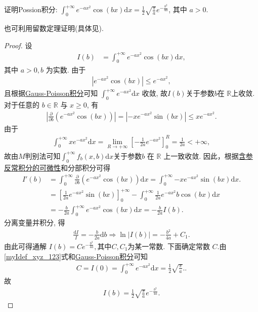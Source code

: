 \documentclass[../../main.tex]{subfiles}%
\begin{document}
\begin{proposition}\label{proposition:Possion积分-数分}
证明Possion积分: \(\int_0^{+\infty} e^{-ax^2} \cos(bx) \mathrm{d}x = \frac{1}{2}\sqrt{\frac{\pi}{a}} e^{-\frac{b^2}{4a}}\), 其中 \(a>0\).
\end{proposition}
\begin{remark}
也可利用留数定理证明(具体见).
\end{remark}
\begin{proof}
设
\begin{align}
I(b) &= \int_0^{+\infty} e^{-ax^2} \cos(bx) \mathrm{d}x, \label{myIdef_xyz_123}
\end{align}
其中 \(a>0, b\) 为实数.
由于
\begin{align*}
\left| e^{-ax^2} \cos(bx) \right| \leq e^{-ax^2},
\end{align*}
且根据\hyperref[proposition:重要定积分结论-1]{Gauss-Poisson积分}可知 \(\int_0^{+\infty} e^{-ax^2} \mathrm{d}x\) 收敛, 故$I(b)$关于参数$b$在 \(\mathbb{R}\)上收敛. 
对于任意的 \(b \in \mathbb{R}\) 与 \(x \geq 0\), 有
\begin{align*}
\left| \frac{\partial}{\partial b} \left( e^{-ax^2} \cos(bx) \right) \right|=\left| -x e^{-ax^2} \sin(bx) \right| \leq x e^{-ax^2}.
\end{align*}
由于
\begin{align*}
\int_0^{+\infty} x e^{-ax^2} \mathrm{d}x = \lim_{R \to +\infty} \left[ -\frac{1}{2a} e^{-ax^2} \right]_0^{R} = \frac{1}{2a}<+\infty,
\end{align*}
故由\(M\)判别法可知\(\int_0^{+\infty} f_b(x, b) \mathrm{d}x\)关于参数\(b\) 在 \(\mathbb{R}\) 上一致收敛.
因此，根据\hyperref[theorem:含参反常积分的可微性]{含参反常积分的可微性}和分部积分可得
\begin{align*}
I' (b)&=\int_0^{+\infty}{\frac{\partial}{\partial b}\left( e^{-ax^2}\cos(bx) \right) \mathrm{d}x}=\int_0^{+\infty}{-xe^{-ax^2}\sin(bx)\mathrm{d}x.}
\\
&=\left[ \frac{1}{2a}e^{-ax^2}\sin(bx) \right] _{0}^{+\infty}-\int_0^{+\infty}{\frac{1}{2a}e^{-ax^2}b\cos(bx)\mathrm{d}x}
\\
&=-\frac{b}{2a}\int_0^{+\infty}{e^{-ax^2}\cos(bx)\mathrm{d}x}=-\frac{b}{2a}I(b).
\end{align*}
分离变量并积分, 得
\begin{align*}
\frac{\mathrm{d}I}{I} = -\frac{b}{2a} \mathrm{d}b\Longrightarrow 
\ln|I(b)| = -\frac{b^2}{4a} + C_1. 
\end{align*}
由此可得通解 \(I(b) = C e^{-\frac{b^2}{4a}},\)其中$C,C_1$为某一常数.
下面确定常数 \(C\).由\eqref{myIdef_xyz_123}式和\hyperref[proposition:重要定积分结论-1]{Gauss-Poisson积分}可知
\begin{align*}
C=I(0) = \int_0^{+\infty} e^{-ax^2} \mathrm{d}x= \frac{1}{2}\sqrt{\frac{\pi}{a}}..
\end{align*}
故
\begin{align*}
I(b) = \frac{1}{2}\sqrt{\frac{\pi}{a}} e^{-\frac{b^2}{4a}}.
\end{align*}
\end{proof}
\end{document}
